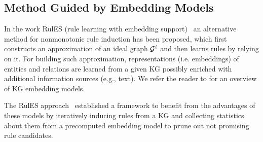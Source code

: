 


\subsection{Method Guided by Embedding Models}



In the work RulES (rule learning with embedding support)~\cite{thinh2018} an alternative method for nonmonotonic rule induction has been proposed, which first constructs an approximation of an ideal graph $\mathcal{G}^i$ and then learns rules by relying on it. For building such approximation, representations (i.e. embeddings) of entities and relations are learned from a given KG possibly enriched with additional information sources (e.g., text). We refer the reader to \cite{Wang2017} for an overview of KG embedding models. %

The RulES approach~\cite{thinh2018} established a framework to benefit from the advantages of these models %
by iteratively inducing rules from a KG and collecting statistics about them from a precomputed embedding model to prune out not promising rule candidates.


